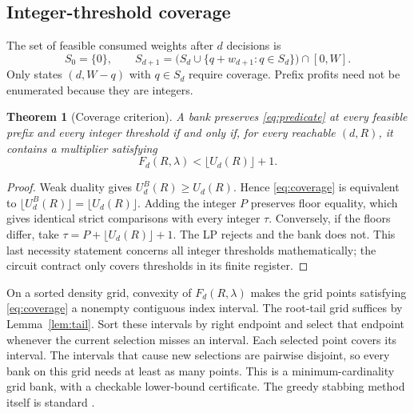 \documentclass[referee,pdflatex,sn-mathphys-num]{sn-jnl}
\theoremstyle{thmstyleone}
\newtheorem{theorem}{Theorem}
\theoremstyle{thmstyletwo}
\begin{document}
\subsection{Integer-threshold coverage}
The set of feasible consumed weights after $d$ decisions is
\begin{equation}\label{eq:reach}
 S_0=\{0\},\qquad S_{d+1}=\bigl(S_d\cup\{q+w_{d+1}:q\in S_d\}\bigr)\cap[0,W].
\end{equation}
Only states $(d,W-q)$ with $q\in S_d$ require coverage. Prefix profits need not be enumerated because they are integers.

\begin{theorem}[Coverage criterion]\label{thm:coverage}
A bank preserves \eqref{eq:predicate} at every feasible prefix and every integer threshold if and only if, for every reachable $(d,R)$, it contains a multiplier satisfying
\begin{equation}\label{eq:coverage}
 F_d(R,\lambda)<\lfloor U_d(R)\rfloor+1.
\end{equation}
\end{theorem}
\begin{proof}
Weak duality gives $U^B_d(R)\geq U_d(R)$. Hence \eqref{eq:coverage} is equivalent to $\lfloor U^B_d(R)\rfloor=\lfloor U_d(R)\rfloor$. Adding the integer $P$ preserves floor equality, which gives identical strict comparisons with every integer $\tau$. Conversely, if the floors differ, take $\tau=P+\lfloor U_d(R)\rfloor+1$. The LP rejects and the bank does not. This last necessity statement concerns all integer thresholds mathematically; the circuit contract only covers thresholds in its finite register.
\end{proof}

On a sorted density grid, convexity of $F_d(R,\lambda)$ makes the grid points satisfying \eqref{eq:coverage} a nonempty contiguous index interval. The root-tail grid suffices by Lemma~\ref{lem:tail}. Sort these intervals by right endpoint and select that endpoint whenever the current selection misses an interval. Each selected point covers its interval. The intervals that cause new selections are pairwise disjoint, so every bank on this grid needs at least as many points. This is a minimum-cardinality grid bank, with a checkable lower-bound certificate. The greedy stabbing method itself is standard \cite{erickson2019algorithms}.
\end{document}
